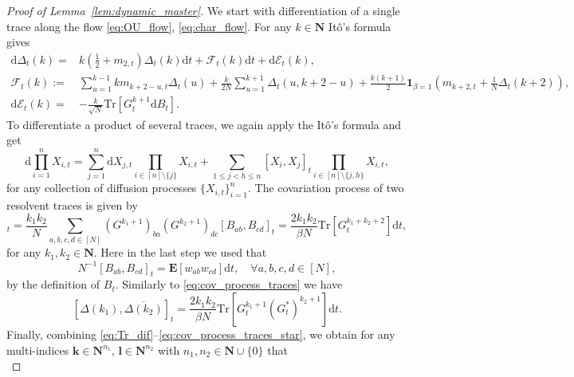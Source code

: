 \documentclass[10pt,a4paper]{amsart}
\newcommand{\E}{\mathbf{E}}
\newcommand{\N}{\mathbf{N}}
\newcommand{\dif}{\mathrm{d}}
\begin{document}
\begin{proof}[Proof of Lemma~\ref{lem:dynamic_master}] We start with differentiation of a single trace along the flow \eqref{eq:OU_flow}, \eqref{eq:char_flow}. For any $k \in \N$ It\^{o}'s formula gives
\begin{equation}
\begin{split}
\dif \Delta_t(k) =& k\left(\frac{1}{2}+m_{2,t}\right) \Delta_t(k) \dif t + \mathcal{F}_t(k)\dif t + \dif \mathcal{E}_t(k),\\
\mathcal{F}_t(k):= &\sum_{u=1}^{k-1} km_{k+2-u,t} \Delta_t(u)+ \frac{k}{2N} \sum_{u=1}^{k+1} \Delta_t (u,k+2-u)+\frac{k(k+1)}{2}\bm{1}_{\beta=1}\left(\!m_{k+2,t}+\frac{1}{N}\Delta_t(k+2)\!\right)\!,\\
\dif \mathcal{E}_t(k) = &-\frac{k}{\sqrt{N}} \mathrm{Tr}[G_t^{k+1}\dif B_t].
\end{split}
\label{eq:Tr_dif}
\end{equation}
To differentiate a product of several traces, we again apply the It\^{o}'s formula and get
\begin{equation}
\dif \prod_{i=1}^n X_{i,t} = \sum_{j=1}^n \dif X_{j,t} \prod_{i\in[n]\setminus\{j\}} X_{i,t} + \sum_{1\le j<h\le n}[X_i,X_j]_t \prod_{i\in[n]\setminus\{j,h\}} X_{i,t},
\end{equation}
for any collection of diffusion processes $\{X_{i,t}\}_{i=1}^n$. The covariation process of two resolvent traces is given by
\begin{equation}
[\Delta(k_1),\Delta (k_2)]_t=\frac{k_1k_2}{N}\sum_{a,b,c,d\in [N]}(G^{k_1+1})_{ba}(G^{k_2+1})_{dc}[B_{ab},B_{cd}]_t = \frac{2k_1k_2}{\beta N}\mathrm{Tr}[G_t^{k_1+k_2+2}]\dif t,
\label{eq:cov_process_traces}
\end{equation}
for any $k_1,k_2\in \N$. Here in the last step we used that
\begin{equation}
N^{-1}[B_{ab},B_{cd}]_t = \E [w_{ab}w_{cd}]\dif t,\quad \forall a,b,c,d\in[N],
\end{equation}
by the definition of $B_t$. Similarly to \eqref{eq:cov_process_traces} we have
\begin{equation}
\left[\Delta(k_1),\overline{\Delta (k_2)}\right]_t=\frac{2k_1k_2}{\beta N}\mathrm{Tr}[G_t^{k_1+1}(G_t^*)^{k_2+1}]\dif t.
\label{eq:cov_process_traces_star}
\end{equation}
Finally, combining \eqref{eq:Tr_dif}--\eqref{eq:cov_process_traces_star}, we obtain for any multi-indices $\bm{k}\in\N^{n_1}$, $\bm{l}\in\N^{n_2}$ with $n_1,n_2\in\N\cup\{0\}$ that
\begin{equation}

\end{equation}
\end{proof}
\end{document}
